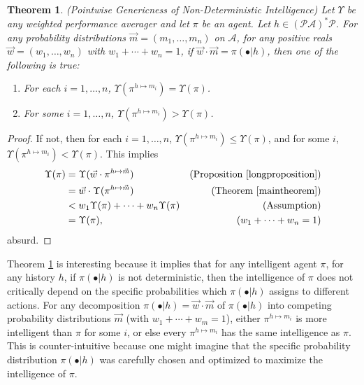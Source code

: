 \documentclass{article}
\newtheorem{theorem}{Theorem}
\begin{document}
\begin{theorem}
\label{pointwisegenericnessthm}
    (Pointwise Genericness of Non-Deterministic Intelligence)
    Let $\Upsilon$ be any weighted performance averager and let
    $\pi$ be an agent.
    Let $h\in (\mathcal P\mathcal A)^*\mathcal P$.
    For any probability distributions $\vec m=(m_1,\ldots,m_n)$ on $\mathcal A$,
    for any positive reals $\vec w=(w_1,\ldots,w_n)$ with $w_1+\cdots+w_n=1$,
    if $\vec w\cdot\vec m=\pi(\bullet|h)$,
    then one of the following is true:
    \begin{enumerate}
        \item For each $i=1,\ldots,n$, $\Upsilon(\pi^{h\mapsto m_i})=\Upsilon(\pi)$.
        \item For some $i=1,\ldots,n$, $\Upsilon(\pi^{h\mapsto m_i})>\Upsilon(\pi)$.
    \end{enumerate}
\end{theorem}

\begin{proof}
    If not, then for each $i=1,\ldots,n$, $\Upsilon(\pi^{h\mapsto m_i})\leq\Upsilon(\pi)$,
    and for some $i$, $\Upsilon(\pi^{h\mapsto m_i})<\Upsilon(\pi)$.
    This implies
    \begin{align*}
        \Upsilon(\pi)
            &= \Upsilon(\vec w\cdot\pi^{h\mapsto\vec m})
                &\mbox{(Proposition \ref{longproposition})}\\
            &= \vec w\cdot\Upsilon(\pi^{h\mapsto\vec m})
                &\mbox{(Theorem \ref{maintheorem})}\\
            &< w_1\Upsilon(\pi)+\cdots+w_n\Upsilon(\pi)
                &\mbox{(Assumption)}\\
            &= \Upsilon(\pi),
                &\mbox{($w_1+\cdots+w_n=1$)}
    \end{align*}
    absurd.
\end{proof}

Theorem \ref{pointwisegenericnessthm} is interesting because it implies that for
any intelligent agent $\pi$, for any history $h$, if $\pi(\bullet|h)$ is not deterministic,
then the intelligence of $\pi$ does not critically depend on the specific probabilities
which $\pi(\bullet|h)$ assigns to different actions. For any decomposition
$\pi(\bullet|h)=\vec w\cdot\vec m$ of $\pi(\bullet|h)$ into competing probability
distributions $\vec m$
(with $w_1+\cdots+w_m=1$), either $\pi^{h\mapsto m_i}$ is more intelligent
than $\pi$ for some $i$, or else every $\pi^{h\mapsto m_i}$ has the same intelligence as
$\pi$. This is counter-intuitive because one might imagine that the specific probability
distribution $\pi(\bullet|h)$ was carefully chosen and optimized to maximize the intelligence
of $\pi$.
\end{document}
